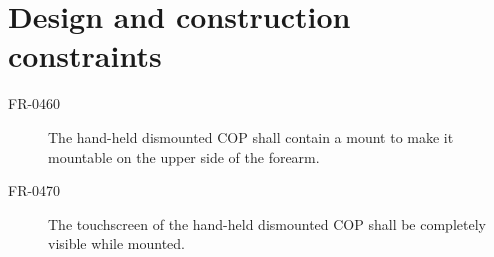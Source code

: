 \section{Design and construction constraints}

\begin{description}
	\item[FR-0460] The hand-held dismounted COP shall contain a mount to make it mountable on the upper side of the forearm. 
	\item[FR-0470] The touchscreen of the hand-held dismounted COP shall be completely visible while mounted. 
\end{description}